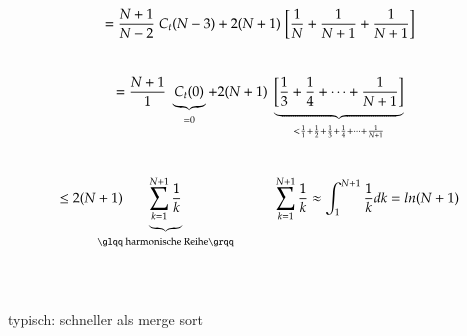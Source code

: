 \documentclass[11pt, fleqn]{scrreprt}
\begin{document}
\begin{itemize}
		\vspace*{-9mm}
		\[ = \frac{N+1}{N-2} \hspace*{1mm} C_t(N-3) + 2(N+1)  \hspace*{1mm}\biggl\lbrack\frac{1}{N}+\frac{1}{N+1}+ \frac{1}{N+1}\biggr\rbrack\] \\
		\vspace*{-9mm}
		\[= \frac{N+1}{1} \hspace*{1mm} \underbrace{C_t(0)}_{=0} + 2(N+1)  \hspace*{1mm} \underbrace{\biggl\lbrack \frac{1}{3} + \frac{1}{4} + \dots + \frac{1}{N+1}\biggr\rbrack}_{< \frac{1}{1}+ \frac{1}{2}+ \frac{1}{3}+\frac{1}{4}+\dots+\frac{1}{N+1}} \]\\
		\vspace*{-7mm}
		\[\leq 2(N+1)\hspace*{-7mm}\underbrace{ \sum_{k=1}^{N+1} \frac{1}{k}}_{\text{\glqq harmonische Reihe\grqq}}\hspace*{1cm}\sum_{k=1}^{N+1} \frac{1}{k} \approx \int_{1}^{N+1} \frac{1}{k} dk = ln(N+1) \]\\
		\vspace*{-9mm}
		 \\
		\vspace*{5mm}
		
	typisch: schneller als merge sort
	

\end{itemize}
\end{document}
